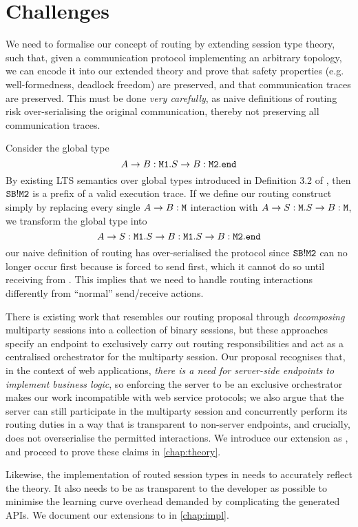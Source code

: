 \section{Challenges}
\label{section:routerchallenges}

We need to formalise our concept of routing by extending session
type theory, such that, given a communication protocol implementing 
an arbitrary topology, we can encode it into our extended theory and
prove that safety properties (e.g. well-formedness, deadlock freedom)
are preserved, and that communication traces are preserved.
This must be done \textit{very carefully}, as
naive definitions of routing risk 
over-serialising the original communication,
thereby not preserving all communication traces.

\begin{example}
Consider the global type
\[
A \to B: \texttt{M1}. S \to B: \texttt{M2}. \texttt{end}
\]
By existing LTS semantics over
global types introduced in 
Definition 3.2 of \cite{characterisation}, 
then ${\mathtt{S}}{\mathtt{B}}!{\texttt{M2}}$
is a prefix of a valid execution trace.
If we define our routing construct simply by replacing every single
$A \to B: \texttt{M}$ interaction with $A \to S: \texttt{M}.
S \to B: \texttt{M}$, we transform the global type into
\[
A \to S: \texttt{M1}. S \to B: \texttt{M1}. S \to B: \texttt{M2}. \texttt{end}
\]
our naive definition of routing has over-serialised the protocol
since ${\mathtt{S}}{\mathtt{B}}!{\texttt{M2}}$ can no longer occur first because 
is forced to send  first, which it cannot do so until receiving
from .
This implies that we need to handle routing interactions differently
from ``normal'' send/receive actions.
\end{example}

There is existing work \cite{LinearDecomp, BinaryDecomp, BinaryDuality}
that resembles our routing proposal through
\textit{decomposing} multiparty sessions into a collection
of binary sessions,
but these approaches
specify an endpoint to exclusively carry out
routing responsibilities and act as a centralised orchestrator 
for the multiparty session.
Our proposal recognises that, in the context of web applications,
\textit{there is a need for server-side endpoints to 
implement business logic},
so enforcing the server to be an exclusive orchestrator makes our work
incompatible with web service protocols; 
we also argue that the server can still participate in the 
multiparty session and concurrently perform its routing duties
in a way that is transparent to non-server endpoints, and crucially,
does not overserialise the permitted interactions. 
We introduce our extension as \newtheory,
and proceed to prove these claims in \cref{chap:theory}.

Likewise, the implementation of routed session types 
in \codegen needs to accurately reflect the theory.
It also needs to be 
as transparent to the developer as possible to minimise
the learning curve overhead demanded 
by complicating the generated APIs.
We document our extensions
to \codegen in \cref{chap:impl}.